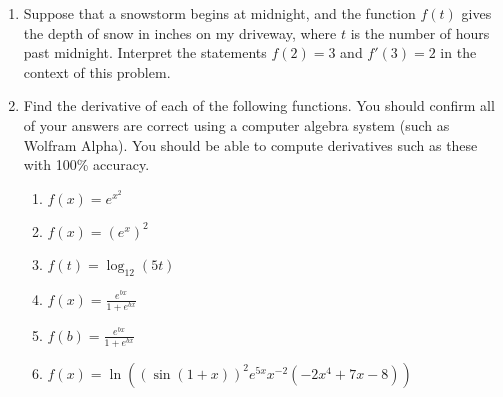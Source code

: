 \documentclass{article}
\begin{document}
\begin{itemize}
\begin{enumerate}
\begin{center}
\end{center}
                  \item Suppose that a snowstorm begins at midnight, and the function $f(t)$ gives the depth of snow in inches on my driveway, where $t$ is the number of hours past midnight. Interpret the statements $f(2) = 3$ and $f'(3) = 2$ in the context of this problem.          \item Find the derivative of each of the following functions. You should confirm all of your answers are correct using a computer algebra system (such as Wolfram Alpha). You should be able to compute derivatives such as these with 100\% accuracy.
                \begin{enumerate}
                    \item $\displaystyle f(x) = e^{x^2}$
                    \item $\displaystyle f(x) = (e^x)^2$
                    \item $\displaystyle f(t) = \log_{12}(5t)$
                    \item $\displaystyle f(x) = \frac{e^{bx}}{1+e^{bx}}$
                    \item $\displaystyle f(b) = \frac{e^{bx}}{1+e^{bx}}$
                    \item $\displaystyle f(x) = \ln{\left(\left(\sin{(1+x)}\right)^2e^{5x}x^{-2}(-2x^4+7x-8)\right)}$
                    

\end{enumerate}
\end{enumerate}
\end{itemize}
\end{document}
